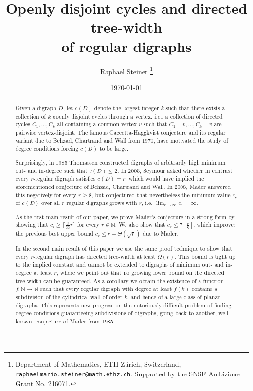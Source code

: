 \documentclass[a4paper,10pt]{article}
\author
{
Raphael Steiner \thanks{Department of Mathematics, ETH Z\"{u}rich, Switzerland,  \texttt{raphaelmario.steiner@math.ethz.ch}.
Supported by the SNSF Ambizione Grant No. 216071.}
}
\date{\today}
\title{Openly disjoint cycles and directed tree-width\\ of regular digraphs}
\begin{document}
\maketitle

\begin{abstract}
Given a digraph $D$, let $c(D)$ denote the largest integer $k$ such that there exists a collection of $k$ openly disjoint cycles through a vertex, i.e., a collection of directed cycles $C_1,\ldots,C_k$ all containing a common vertex $v$ such that $C_1-v,\ldots,C_k-v$ are pairwise vertex-disjoint. The famous Caccetta-Häggkvist conjecture and its regular variant due to Behzad, Chartrand and Wall from 1970, have motivated the study of degree conditions forcing $c(D)$ to be large.

Surprisingly, in 1985 Thomassen constructed digraphs of arbitrarily high minimum out- and in-degree such that $c(D)\le 2$. In 2005, Seymour asked whether in contrast every $r$-regular digraph satisfies $c(D)=r$, which would have implied the aforementioned conjecture of Behzad, Chartrand and Wall. In 2008, Mader answered this negatively for every $r\ge 8$, but conjectured that nevertheless the minimum value $c_r$ of $c(D)$ over all $r$-regular digraphs grows with $r$, i.e. $\lim_{r\rightarrow\infty}c_r=\infty$. 

As the first main result of our paper, we prove Mader's conjecture in a strong form by showing that $c_r\ge \lceil\frac{3}{22} r\rceil$ for every $r\in \mathbb{N}$. We also show that 
$c_r\le 7\left\lceil \frac{r}{8}\right\rceil$, which improves the previous best upper bound $c_r\le r-\Theta(\sqrt{r})$ due to Mader.

In the second main result of this paper we use the same proof technique to show that every $r$-regular digraph has directed tree-width at least $\Omega(r)$. This bound is tight up to the implied constant and cannot be extended to digraphs of minimum out- and in-degree at least $r$, where we point out that no growing lower bound on the directed tree-width can be guaranteed. As a corollary we obtain the existence of a function $f:\mathbb{N}\rightarrow \mathbb{N}$ such that every regular digraph with degree at least $f(k)$ contains a subdivision of the cylindrical wall of order $k$, and hence of a large class of planar digraphs. This represents new progress on the notoriously difficult problem of finding degree conditions guaranteeing subdivisions of digraphs, going back to another, well-known, conjecture of Mader from 1985.
\end{abstract}
\end{document}
